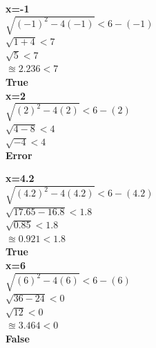\documentclass[12pt,fleqn]{book} %
\begin{document}
\begin{multicols}{2}
\begin{center}
    \textbf{x=-1}\\
    $\sqrt{(-1)^2-4(-1)}<6-(-1)$\\
    $\sqrt{1+4}<7$\\
    $\sqrt{5}<7$\\
    $\approxeq2.236<7$\\
    \textbf{True}\\
    \columnbreak
    \textbf{x=2}\\
    $\sqrt{(2)^2-4(2)}<6-(2)$\\
    $\sqrt{4-8}<4$\\
    $\sqrt{-4}<4$\\
    \textbf{Error}\\
\end{center}
\end{multicols}

\begin{multicols}{2}
\begin{center}
    \textbf{x=4.2}\\
    $\sqrt{(4.2)^2-4(4.2)}<6-(4.2)$\\
    $\sqrt{17.65-16.8}<1.8$\\
    $\sqrt{0.85}<1.8$\\
    $\approxeq0.921<1.8$\\
    \textbf{True}\\
    \columnbreak
    \textbf{x=6}\\
    $\sqrt{(6)^2-4(6)}<6-(6)$\\
    $\sqrt{36-24}<0$\\
    $\sqrt{12}<0$\\
    $\approxeq3.464<0$\\
    \textbf{False}\\
\end{center}
\end{multicols}
\end{document}

